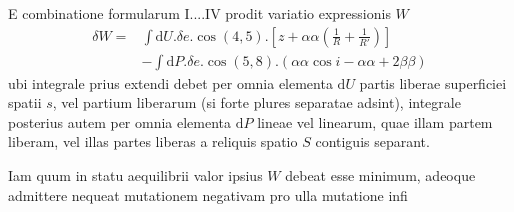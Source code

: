 E combinatione formularum I....IV prodit variatio expressionis $W$
\[
\begin{aligned}
\delta W={}&\int\mathrm{d}U.\delta e.\cos(4,5).[z+\alpha\alpha(\frac{1}{R}+\frac{1}{R'})]\\
&-\int\mathrm{d}P.\delta e.\cos(5,8).(\alpha\alpha\cos i-\alpha\alpha+2\beta\beta)
\end{aligned}
\]
ubi integrale prius extendi debet per omnia elementa $\mathrm{d}U$ partis liberae superficiei spatii $s$, vel partium liberarum (si forte plures separatae adsint), integrale posterius autem per omnia elementa $\mathrm{d}P$ lineae vel linearum, quae illam partem liberam, vel illas partes liberas a reliquis spatio $S$ contiguis separant.

Iam quum in statu aequilibrii valor ipsius $W$ debeat esse minimum, adeoque admittere nequeat mutationem negativam pro ulla mutatione infi%
